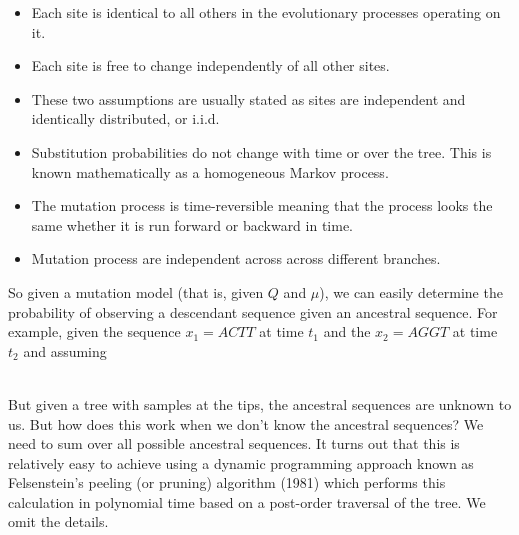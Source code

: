 \documentclass[11pt]{article}
\begin{document}
\begin{itemize}
 \item   Each site is identical to all others in the evolutionary processes operating on it.
\item    Each site is free to change independently of all other sites.
\item    These two assumptions are usually stated as sites are independent and identically distributed, or i.i.d.
\item    Substitution probabilities do not change with time or over the tree. This is known mathematically as a homogeneous Markov process.
\item    The mutation process is time-reversible meaning that the process looks the same whether it is run forward or backward in time.
\item Mutation process are independent across across different branches.
\end{itemize}

So given a mutation model (that is, given $Q$ and $\mu$), we can easily determine the probability of observing a descendant sequence given an ancestral sequence.  For example, given the sequence $x_1 = ACTT$ at time $t_1$ and the $x_2 = AGGT$ at time $t_2$ and assuming 

%
\\

But given a tree with samples at the tips, the ancestral sequences are unknown to us.  But how does this work when we don't know the ancestral sequences?  We need to sum over all possible ancestral sequences. It turns out that this is relatively easy to achieve using a dynamic programming approach known as Felsenstein's peeling (or pruning) algorithm (1981) which performs this calculation in polynomial time based on a post-order traversal of the tree.  We omit the details.
\end{document}
